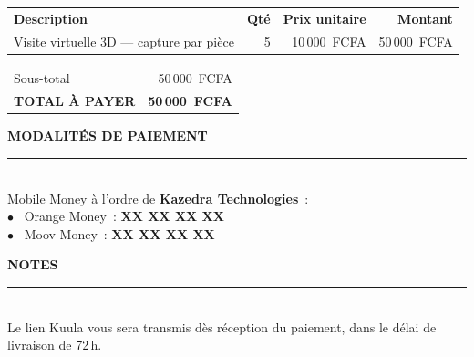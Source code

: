 \documentclass[11pt,a4paper]{article}
\newcommand{\itemDescription}{Visite virtuelle 3D --- capture par pièce \newline {\small\color{kazedraMuted}Insta360 + hébergement Kuula --- livraison 72\,h}}
\newcommand{\itemQty}{5}
\newcommand{\itemUnitPrice}{10\,000~FCFA}
\newcommand{\itemSubtotal}{50\,000~FCFA}
\newcommand{\discountRow}{}
\newcommand{\subtotalAmount}{50\,000~FCFA}
\newcommand{\totalAmount}{50\,000~FCFA}
\newcommand{\payHolder}{Kazedra Technologies}
\newcommand{\payOrange}{XX XX XX XX}
\newcommand{\payMoov}{XX XX XX XX}
\newcommand{\invoiceNotes}{Le lien Kuula vous sera transmis dès réception du paiement, dans le délai de livraison de 72\,h.}
\begin{document}
\vspace{1.2cm}

\renewcommand{\arraystretch}{1.5}

\noindent
\begin{tabularx}{\textwidth}{>{\raggedright\arraybackslash}X r r r}
  \arrayrulecolor{kazedraOrange}\hline
  \rowcolor{kazedraCream}
  \textbf{Description} & \textbf{Qté} & \textbf{Prix unitaire} & \textbf{Montant} \\
  \arrayrulecolor{kazedraRule}\hline
  \itemDescription & \itemQty & \itemUnitPrice & \itemSubtotal \\
  \hline
\end{tabularx}

\vspace{0.6cm}

\noindent\hfill
\begin{minipage}{0.5\textwidth}
  \renewcommand{\arraystretch}{1.4}
  \begin{tabularx}{\textwidth}{X r}
    Sous-total & \subtotalAmount \\
    \discountRow
    \arrayrulecolor{kazedraOrange}\hline
    \textbf{\large TOTAL À PAYER} & {\bfseries\large\color{kazedraOrange} \totalAmount} \\
  \end{tabularx}
\end{minipage}

\vspace{1.4cm}

\noindent
{\bfseries\color{kazedraDark}\large MODALITÉS DE PAIEMENT}\\[4pt]
\textcolor{kazedraRule}{\rule{\textwidth}{0.5pt}}\\[8pt]
{\small Mobile Money à l'ordre de \textbf{\payHolder}~:}\\[6pt]
\hspace{1em}\textcolor{kazedraOrange}{$\bullet$}~ Orange Money~: \textbf{\payOrange}\\[2pt]
\hspace{1em}\textcolor{kazedraOrange}{$\bullet$}~ Moov Money~: \textbf{\payMoov}

\vspace{0.8cm}

\noindent
{\bfseries\color{kazedraDark} NOTES}\\[4pt]
\textcolor{kazedraRule}{\rule{\textwidth}{0.5pt}}\\[6pt]
{\small \invoiceNotes}
\end{document}

